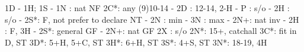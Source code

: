 1D - 1H; 1S -
1N : nat NF
2C*: any (9)10-14
   - 2D : 12-14, 2-H
        - P  : s/o
        - 2H : s/o
        - 2S*: F, not prefer to declare NT
             - 2N : min
             - 3N : max
        - 2N+: nat inv
   - 2H : F, 3H
   - 2S*: general GF
   - 2N+: nat GF
2X : s/o
2N*: 15+, catchall
3C*: fit in D, ST
3D*: 5+H, 5+C, ST
3H*: 6+H, ST
3S*: 4+S, ST
3N*: 18-19, 4H
